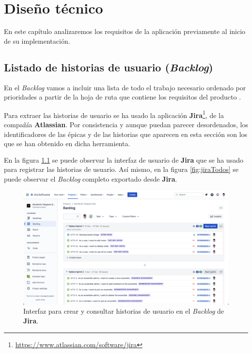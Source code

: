 \chapter{Diseño técnico}

En este capítulo analizaremos los requisitos de la aplicación previamente al inicio de su implementación.

\section{Listado de historias de usuario (\textit{Backlog})}

En el \textit{Backlog} vamos a incluir una lista de todo el trabajo necesario ordenado por prioridades a partir de la hoja de ruta que contiene los requisitos del producto \cite{whatIsBacklog}.

Para extraer las historias de usuario se ha usado la aplicación \textbf{Jira}\footnote{\url{https://www.atlassian.com/software/jira}}, de la compañía \textbf{Atlassian}. Por consistencia y aunque puedan parecer desordenados, los identificadores de las épicas y de las historias que aparecen en esta sección son los que se han obtenido en dicha herramienta.

En la figura \ref{fig:jiraBacklog} se puede observar la interfaz de usuario de \textbf{Jira} que se ha usado para registrar las historias de usuario. Así mismo, en la figura \ref{fig:jiraTodos} se puede observar el \textit{Backlog} completo exportado desde \textbf{Jira}.

\begin{figure}[h]
\centering
\captionsetup{justification=centering}
\includegraphics[width=\textwidth]{imagenes/disenyo_tecnico/jira_backlog.png}
\caption{Interfaz para crear y consultar historias de usuario en el \textit{Backlog} de \textbf{Jira}.}
\label{fig:jiraBacklog}
\end{figure}

